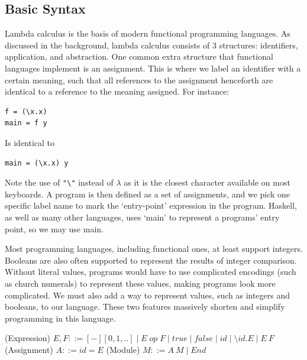 \subsection{Basic Syntax}
Lambda calculus is the basis of modern functional programming languages. As discussed in the background, lambda calculus consists of 3 structures: identifiers, application, and abstraction.  One common extra structure that functional languages implement is an assignment. This is where we label an identifier with a certain meaning, such that all references to the assignment henceforth are identical to a reference to the meaning assigned. For instance:
\begin{lstlisting}[language=SFL]
f = (\x.x)
main = f y
\end{lstlisting}
Is identical to 
\begin{lstlisting}[language=SFL]
main = (\x.x) y
\end{lstlisting}
Note the use of \verb|"\"| instead of \(\lambda\) as it is the closest character available on most keyboards. A program is then defined as a set of assignments, and we pick one specific label name to mark the `entry-point' expression in the program. Haskell, as well as many other languages, uses `main' to represent a programs' entry point, so we may use main. 

Most programming languages, including functional ones, at least support integers. Booleans are also often supported to represent the results of integer comparison. Without literal values, programs would have to use complicated encodings (such as church numerals) to represent these values, making programs look more complicated.  We must also add a way to represent values, such as integers and booleans, to our language. 
These two features massively shorten and simplify programming in this language.

\begin{syntax}
(Expression) \(E, F ::= [-][0, 1, ..]\mid E\; op\; F \mid true \mid false \mid id \mid \setminus id. E \mid E\:F\)\newline
(Assignment) \(A ::= id = E\)\newline
(Module) \(M ::= A\: M \mid End\)
\end{syntax}

